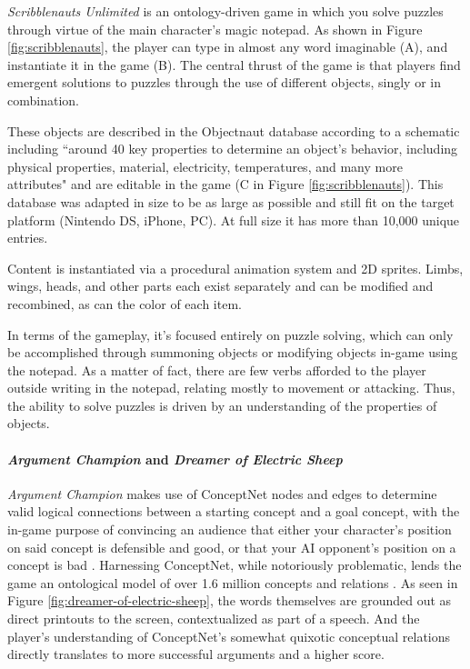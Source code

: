 
\textit{Scribblenauts Unlimited} is an ontology-driven game in which you solve puzzles through virtue of the main character's magic notepad. As shown in Figure  \ref{fig:scribblenauts}, the player can type in almost any word imaginable (A), and instantiate it in the game (B). The central thrust of the game is that players find emergent solutions to puzzles through the use of different objects, singly or in combination.

These objects are described in the Objectnaut database according to a schematic including ``around 40 key properties to determine an object’s behavior, including physical properties, material, electricity, temperatures, and many more attributes" \cite{tringali_2009} and are editable in the game (C in Figure \ref{fig:scribblenauts}). This database was adapted in size to be as large as possible and still fit on the target platform (Nintendo DS, iPhone, PC). At full size it has more than 10,000 unique entries.

Content is instantiated via a procedural animation system and 2D sprites. Limbs, wings, heads, and other parts each exist separately and can be modified and recombined, as can the color of each item. 

In terms of the gameplay, it's focused entirely on puzzle solving, which can only be accomplished through summoning objects or modifying objects in-game using the notepad. As a matter of fact, there are few verbs afforded to the player outside writing in the notepad, relating mostly to movement or attacking. Thus, the ability to solve puzzles is driven by an understanding of the properties of objects.

\paragraph{\textit{Argument Champion} and \textit{Dreamer of Electric Sheep}}\label{par:argument-champion}

\textit{Argument Champion} makes use of ConceptNet nodes and edges to determine valid logical connections between a starting concept and a goal concept, with the in-game purpose of convincing an audience that either your character's position on said concept is defensible and good, or that your AI opponent's position on a concept is bad \cite{smith_2012}. Harnessing ConceptNet, while notoriously problematic, lends the game an ontological model of over 1.6 million concepts and relations \cite{liu2004conceptnet}. As seen in Figure \ref{fig:dreamer-of-electric-sheep}, the words themselves are grounded out as direct printouts to the screen, contextualized as part of a speech. And the player's understanding of ConceptNet's somewhat quixotic conceptual relations directly translates to more successful arguments and a higher score.

